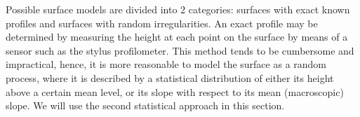 Possible surface models are divided into 2 categories: surfaces with exact known profiles and surfaces with random irregularities. An exact profile may be determined by measuring the height at each point on the surface by means of a sensor such as the stylus profilometer. This method tends to be cumbersome and impractical, hence, it is more reasonable to model the surface as a random process, where it is described by a statistical distribution of either its height above a certain mean level, or its slope with respect to its mean (macroscopic) slope. We will use the second statistical approach in this section.








